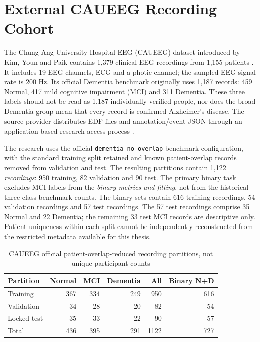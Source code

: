 \section{External CAUEEG Recording Cohort}
The Chung-Ang University Hospital EEG (CAUEEG) dataset introduced by Kim, Youn and Paik contains 1,379 clinical EEG recordings from 1,155 patients \cite{kim2023caueeg}. It includes 19 EEG channels, ECG and a photic channel; the sampled EEG signal rate is 200 Hz. Its official Dementia benchmark originally uses 1,187 records: 459 Normal, 417 mild cognitive impairment (MCI) and 311 Dementia. These three labels should not be read as 1,187 individually verified people, nor does the broad Dementia group mean that every record is confirmed Alzheimer's disease. The source provider distributes EDF files and annotation/event JSON through an application-based research-access process \cite{caueegofficial}.

The research uses the official \texttt{dementia-no-overlap} benchmark configuration, with the standard training split retained and known patient-overlap records removed from validation and test. The resulting partitions contain 1,122 \emph{recordings}: 950 training, 82 validation and 90 test. The primary binary task excludes MCI labels from the \emph{binary metrics and fitting}, not from the historical three-class benchmark counts. The binary sets contain 616 training recordings, 54 validation recordings and 57 test recordings. The 57 test recordings comprise 35 Normal and 22 Dementia; the remaining 33 test MCI records are descriptive only. Patient uniqueness within each split cannot be independently reconstructed from the restricted metadata available for this thesis.

\begin{table}[!htbp]\centering\small
\caption{CAUEEG official patient-overlap-reduced recording partitions, not unique participant counts}\label{tab:caueeg-splits}
\begin{tabular}{@{}lrrrrr@{}}\toprule
\textbf{Partition}&\textbf{Normal}&\textbf{MCI}&\textbf{Dementia}&\textbf{All}&\textbf{Binary N+D}\\\midrule
Training&367&334&249&950&616\\
Validation&34&28&20&82&54\\
Locked test&35&33&22&90&57\\\midrule
Total&436&395&291&1122&727\\\bottomrule
\end{tabular}\end{table}

